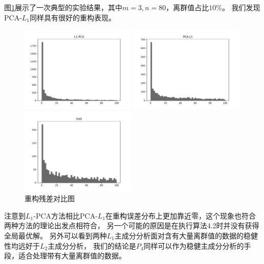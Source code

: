 图\ref{compare-con-error}展示了一次典型的实验结果，其中$m = 3, n = 80$，离群值占比$10\%$。
我们发现PCA-$L_1$同样具有很好的重构表现。

\begin{figure}[H]
    \centering
    \begin{minipage}[t]{0.3\textwidth}
    \includegraphics[width=5.5cm]{pics/lab1/l1-pca.pdf}
    \end{minipage}
    \begin{minipage}[t]{0.3\textwidth}
    \includegraphics[width=5.5cm]{pics/lab1/pca-l1.pdf}
    \end{minipage}
    \begin{minipage}[t]{0.3\textwidth}
    \includegraphics[width=5.5cm]{pics/lab1/svd.pdf}
    \end{minipage}
    \caption{重构残差对比图}
    \label{compare-con-error}
\end{figure}

注意到$L_1$-PCA方法相比PCA-$L_1$在重构误差分布上更加靠近零，这个现象也符合两种方法的理论出发点相符合，
另一个可能的原因是在执行算法4.2时并没有获得全局最优解。
另外可以看到两种$L_1$主成分分析面对含有大量离群值的数据的稳健性均远好于$L_2$主成分分析，
我们的结论是$P_4$同样可以作为稳健主成分分析的手段，适合处理带有大量离群值的数据。


